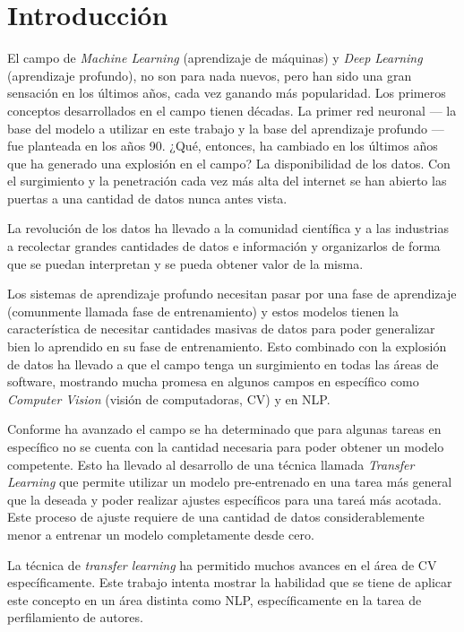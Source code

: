 
\section{Introducción}

El campo de \emph{Machine Learning} (aprendizaje de máquinas) y \emph{Deep Learning} (aprendizaje profundo), no son para nada nuevos, pero han sido una gran sensación en los últimos años, cada vez ganando más popularidad. Los primeros conceptos desarrollados en el campo tienen décadas. La primer red neuronal --- la base del modelo a utilizar en este trabajo y la base del aprendizaje profundo --- fue planteada en los años 90. ¿Qué, entonces, ha cambiado en los últimos años que ha generado una explosión en el campo? La disponibilidad de los datos. Con el surgimiento y la penetración cada vez más alta del internet se han abierto las puertas a una cantidad de datos nunca antes vista.

La revolución de los datos ha llevado a la comunidad científica y a las industrias a recolectar grandes cantidades de datos e información y organizarlos de forma que se puedan interpretan y se pueda obtener valor de la misma.

Los sistemas de aprendizaje profundo necesitan pasar por una fase de aprendizaje (comunmente llamada fase de entrenamiento) y estos modelos tienen la característica de necesitar cantidades masivas de datos para poder generalizar bien lo aprendido en su fase de entrenamiento. Esto combinado con la explosión de datos ha llevado a que el campo tenga un surgimiento en todas las áreas de software, mostrando mucha promesa en algunos campos en específico como \emph{Computer Vision} (visión de computadoras, CV) y en NLP.

Conforme ha avanzado el campo se ha determinado que para algunas tareas en específico no se cuenta con la cantidad necesaria para poder obtener un modelo competente. Esto ha llevado al desarrollo de una técnica llamada \emph{Transfer Learning} que permite utilizar un modelo pre-entrenado en una tarea más general que la deseada y poder realizar ajustes específicos para una tareá más acotada. Este proceso de ajuste requiere de una cantidad de datos considerablemente menor a entrenar un modelo completamente desde cero.

La técnica de \emph{transfer learning} ha permitido muchos avances en el área de CV específicamente. Este trabajo intenta mostrar la habilidad que se tiene de aplicar este concepto en un área distinta como NLP, específicamente en la tarea de perfilamiento de autores.

